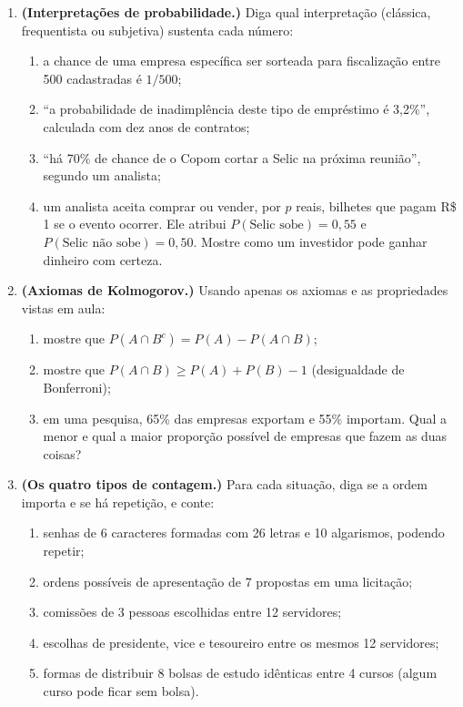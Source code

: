\documentclass[11pt]{article}
\begin{document}
\begin{enumerate}[label=\textbf{A\arabic*.}, leftmargin=*]

\item \textbf{(Interpretações de probabilidade.)} Diga qual interpretação (clássica, frequentista ou subjetiva) sustenta cada número:
\begin{enumerate}[label=(\alph*)]
  \item a chance de uma empresa específica ser sorteada para fiscalização entre 500 cadastradas é $1/500$;
  \item ``a probabilidade de inadimplência deste tipo de empréstimo é 3,2\%'', calculada com dez anos de contratos;
  \item ``há 70\% de chance de o Copom cortar a Selic na próxima reunião'', segundo um analista;
  \item um analista aceita comprar ou vender, por $p$ reais, bilhetes que pagam R\$ 1 se o evento ocorrer. Ele atribui
    $P(\text{Selic sobe}) = 0{,}55$ e $P(\text{Selic não sobe}) = 0{,}50$. Mostre como um investidor pode ganhar dinheiro com certeza.
\end{enumerate}

\item \textbf{(Axiomas de Kolmogorov.)} Usando apenas os axiomas e as propriedades vistas em aula:
\begin{enumerate}[label=(\alph*)]
  \item mostre que $P(A \cap B^c) = P(A) - P(A \cap B)$;
  \item mostre que $P(A \cap B) \geq P(A) + P(B) - 1$ (desigualdade de Bonferroni);
  \item em uma pesquisa, 65\% das empresas exportam e 55\% importam. Qual a menor e qual a maior proporção possível de
    empresas que fazem as duas coisas?
\end{enumerate}

\item \textbf{(Os quatro tipos de contagem.)} Para cada situação, diga se a ordem importa e se há repetição, e conte:
\begin{enumerate}[label=(\alph*)]
  \item senhas de 6 caracteres formadas com 26 letras e 10 algarismos, podendo repetir;
  \item ordens possíveis de apresentação de 7 propostas em uma licitação;
  \item comissões de 3 pessoas escolhidas entre 12 servidores;
  \item escolhas de presidente, vice e tesoureiro entre os mesmos 12 servidores;
  \item formas de distribuir 8 bolsas de estudo idênticas entre 4 cursos (algum curso pode ficar sem bolsa).
\end{enumerate}


\end{enumerate}
\end{document}
